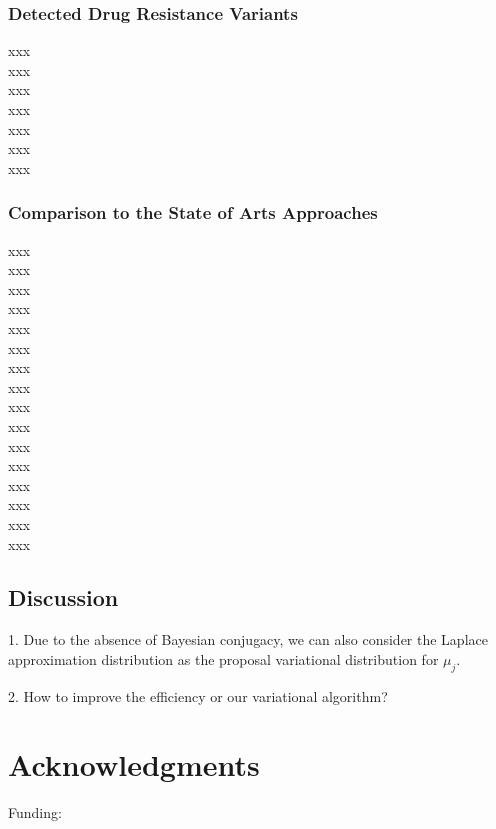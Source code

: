 \documentclass{article}
\begin{document}
\subsubsection{Detected Drug Resistance Variants}
xxx\\
xxx\\
xxx\\
xxx\\
xxx\\
xxx\\
xxx\\


\subsubsection{Comparison to the State of Arts Approaches}
xxx\\
xxx\\
xxx\\
xxx\\
xxx\\
xxx\\
xxx\\
xxx\\
xxx\\
xxx\\
xxx\\
xxx\\
xxx\\
xxx\\
xxx\\
xxx\\

\subsection{Discussion}
1. Due to the absence of Bayesian conjugacy, we can also consider the Laplace approximation distribution as the proposal variational distribution for $\mu_j$.

2. How to improve the efficiency or our variational algorithm?

\section*{Acknowledgments}
Funding:


\appendix



\end{document}
